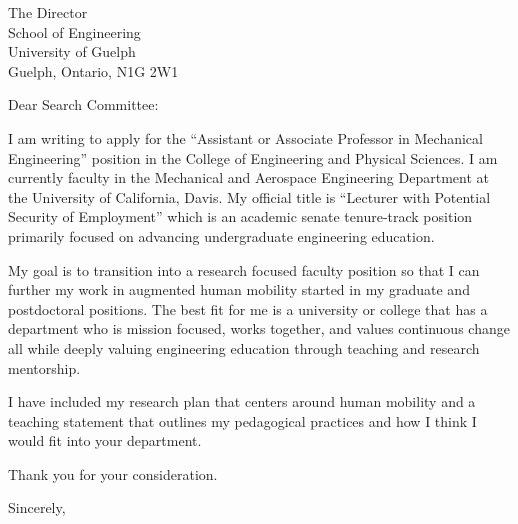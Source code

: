 \documentclass{letter}
\date{April 16, 2019}
\begin{document}
\begin{letter}{
  The Director \\
  School of Engineering \\
  University of Guelph \\
  Guelph, Ontario, N1G 2W1}
\opening{Dear Search Committee:}

I am writing to apply for the ``Assistant or Associate Professor in Mechanical
Engineering'' position in the College of Engineering and Physical Sciences. I
am currently faculty in the Mechanical and Aerospace Engineering Department at
the University of California, Davis. My official title is ``Lecturer with
Potential Security of Employment'' which is an academic senate tenure-track
position primarily focused on advancing undergraduate engineering education.

My goal is to transition into a research focused faculty position so that I can
further my work in augmented human mobility started in my graduate and
postdoctoral positions. The best fit for me is a university or college that has
a department who is mission focused, works together, and values continuous
change all while deeply valuing engineering education through teaching and
research mentorship.

I have included my research plan that centers around human mobility and a
teaching statement that outlines my pedagogical practices and how I think I
would fit into your department.

Thank you for your consideration.

\closing{Sincerely,}

\end{letter}
\end{document}

